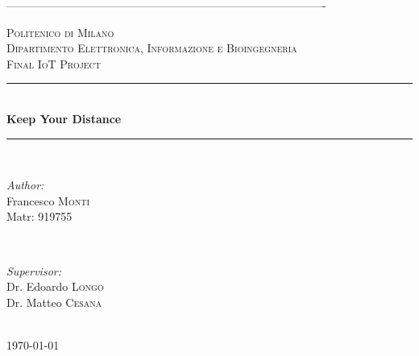 \documentclass[12pt]{article}
\begin{document}
\begin{titlepage}

\newcommand{\HRule}{\rule{\linewidth}{0.5mm}} 

\center
-------------------------------------------------------------------------------------

\textsc{\LARGE Politenico di Milano}\\[1cm]
\textsc{\Large Dipartimento Elettronica, Informazione e Bioingegneria}\\[0.5cm] 
\textsc{\large Final IoT Project}\\[0.5cm] 


\HRule \\[0.4cm]
{ \huge \bfseries Keep Your Distance}\\[0.4cm]
\HRule \\[1.5cm]
 

\begin{minipage}{0.4\textwidth}
	\begin{flushleft} \large
		\emph{Author:}\\
		Francesco \textsc{Monti}\\
		Matr: 919755 
	\end{flushleft}
\end{minipage}
~
\begin{minipage}{0.4\textwidth}
	\begin{flushright} \large
		\emph{Supervisor:} \\
		Dr. Edoardo \textsc{Longo}\\
		Dr. Matteo \textsc{Cesana}
	\end{flushright}
\end{minipage}\\[1.5cm]



{\large \today}\\[2cm] 


\end{titlepage}
\end{document}
